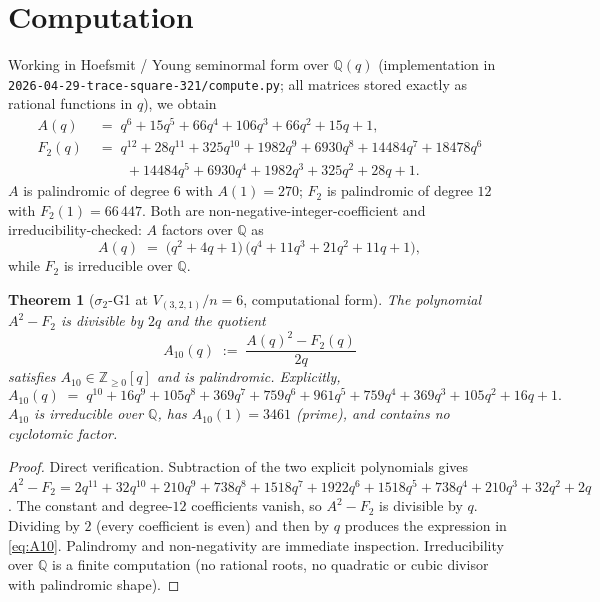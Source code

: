 \documentclass{article}
\newtheorem{theorem}{Theorem}
\theoremstyle{definition}
\begin{document}
\section{Computation}

Working in Hoefsmit / Young seminormal form over $\mathbb{Q}(q)$
(implementation in \texttt{2026-04-29-trace-square-321/compute.py}; all
matrices stored exactly as rational functions in $q$), we obtain
\begin{align}
A(q)\;&=\;q^{6}+15q^{5}+66q^{4}+106q^{3}+66q^{2}+15q+1,\\
F_2(q)\;&=\;q^{12}+28q^{11}+325q^{10}+1982q^{9}+6930q^{8}+14484q^{7}+18478q^{6}\\
&\qquad+14484q^{5}+6930q^{4}+1982q^{3}+325q^{2}+28q+1.
\end{align}
$A$ is palindromic of degree $6$ with $A(1)=270$; $F_2$ is palindromic of degree
$12$ with $F_2(1)=66\,447$. Both are non-negative-integer-coefficient and
irreducibility-checked: $A$ factors over $\mathbb{Q}$ as
\[
A(q)\;=\;\bigl(q^{2}+4q+1\bigr)\,\bigl(q^{4}+11q^{3}+21q^{2}+11q+1\bigr),
\]
while $F_2$ is irreducible over $\mathbb{Q}$.

\begin{theorem}[$\sigma_2$-G1 at $V_{(3,2,1)}/n=6$, computational form]
\label{thm:sigma2-321}
The polynomial $A^2-F_2$ is divisible by $2q$ and the quotient
\[
A_{10}(q)\;:=\;\frac{A(q)^2-F_2(q)}{2q}
\]
satisfies $A_{10}\in\mathbb{Z}_{\geq 0}[q]$ and is palindromic. Explicitly,
\begin{equation}
A_{10}(q)\;=\;q^{10}+16q^{9}+105q^{8}+369q^{7}+759q^{6}+961q^{5}+759q^{4}+369q^{3}+105q^{2}+16q+1.
\label{eq:A10}
\end{equation}
$A_{10}$ is irreducible over $\mathbb{Q}$, has $A_{10}(1)=3461$ (prime), and
contains no cyclotomic factor.
\end{theorem}

\begin{proof}
Direct verification. Subtraction of the two explicit polynomials gives
$A^2-F_2 = 2q^{11}+32q^{10}+210q^{9}+738q^{8}+1518q^{7}+1922q^{6}+1518q^{5}+738q^{4}+210q^{3}+32q^{2}+2q$.
The constant and degree-$12$ coefficients vanish, so $A^2-F_2$ is divisible by
$q$. Dividing by $2$ (every coefficient is even) and then by $q$ produces the
expression in \eqref{eq:A10}. Palindromy and non-negativity are immediate
inspection. Irreducibility over $\mathbb{Q}$ is a finite computation
(no rational roots, no quadratic or cubic divisor with palindromic shape).
\end{proof}
\end{document}
